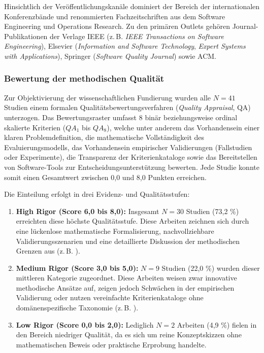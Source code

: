 Hinsichtlich der Veröffentlichungskanäle dominiert der Bereich der internationalen Konferenzbände und renommierten Fachzeitschriften aus dem Software Engineering und Operations Research. Zu den primären Outlets gehören Journal-Publikationen der Verlage IEEE (z.\,B. \textit{IEEE Transactions on Software Engineering}), Elsevier (\textit{Information and Software Technology}, \textit{Expert Systems with Applications}), Springer (\textit{Software Quality Journal}) sowie ACM.

\subsubsection{Bewertung der methodischen Qualität}

Zur Objektivierung der wissenschaftlichen Fundierung wurden alle $N = 41$ Studien einem formalen Qualitätsbewertungsverfahren (\textit{Quality Appraisal}, QA) unterzogen. Das Bewertungsraster umfasst 8 binär beziehungsweise ordinal skalierte Kriterien ($QA_1$ bis $QA_8$), welche unter anderem das Vorhandensein einer klaren Problemdefinition, die mathematische Vollständigkeit des Evaluierungsmodells, das Vorhandensein empirischer Validierungen (Fallstudien oder Experimente), die Transparenz der Kriterienkataloge sowie das Bereitstellen von Software-Tools zur Entscheidungsunterstützung bewerten. Jede Studie konnte somit einen Gesamtwert zwischen 0,0 und 8,0 Punkten erreichen.

Die Einteilung erfolgt in drei Evidenz- und Qualitätsstufen:
\begin{enumerate}
    \item \textbf{High Rigor (Score 6,0 bis 8,0):} Insgesamt $N = 30$ Studien (73,2 \%) erreichten diese höchste Qualitätsstufe. Diese Arbeiten zeichnen sich durch eine lückenlose mathematische Formalisierung, nachvollziehbare Validierungsszenarien und eine detaillierte Diskussion der methodischen Grenzen aus (z.\,B. \cite{LZQJ6M4X, MC9UMXZZ, 8VHUMEKY, NZJEEPAC, LNQHES84}).
    \item \textbf{Medium Rigor (Score 3,0 bis 5,0):} $N = 9$ Studien (22,0 \%) wurden dieser mittleren Kategorie zugeordnet. Diese Arbeiten weisen zwar innovative methodische Ansätze auf, zeigen jedoch Schwächen in der empirischen Validierung oder nutzen vereinfachte Kriterienkataloge ohne domänenspezifische Taxonomie (z.\,B. \cite{CZZ6XQZJ, VUVLUN85, JT5X3FIG}).
    \item \textbf{Low Rigor (Score 0,0 bis 2,0):} Lediglich $N = 2$ Arbeiten (4,9 \%) fielen in den Bereich niedriger Qualität, da es sich um reine Konzeptskizzen ohne mathematischen Beweis oder praktische Erprobung handelte.
\end{enumerate}

